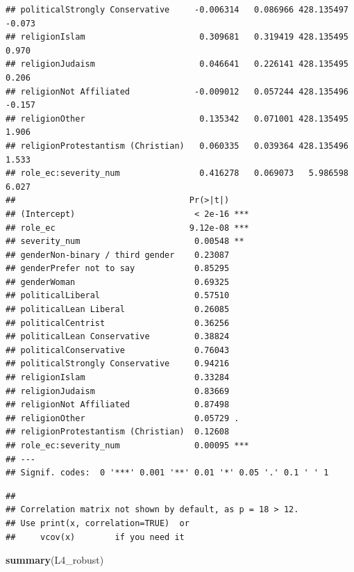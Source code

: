 \documentclass[
]{article}
\newenvironment{Shaded}{\begin{snugshade}}{\end{snugshade}}
\newcommand{\FunctionTok}[1]{\textcolor[rgb]{0.13,0.29,0.53}{\textbf{#1}}}
\newcommand{\NormalTok}[1]{#1}
\begin{document}
\begin{verbatim}
## politicalStrongly Conservative     -0.006314   0.086966 428.135497  -0.073
## religionIslam                       0.309681   0.319419 428.135495   0.970
## religionJudaism                     0.046641   0.226141 428.135495   0.206
## religionNot Affiliated             -0.009012   0.057244 428.135496  -0.157
## religionOther                       0.135342   0.071001 428.135495   1.906
## religionProtestantism (Christian)   0.060335   0.039364 428.135496   1.533
## role_ec:severity_num                0.416278   0.069073   5.986598   6.027
##                                   Pr(>|t|)    
## (Intercept)                        < 2e-16 ***
## role_ec                           9.12e-08 ***
## severity_num                       0.00548 ** 
## genderNon-binary / third gender    0.23087    
## genderPrefer not to say            0.85295    
## genderWoman                        0.69325    
## politicalLiberal                   0.57510    
## politicalLean Liberal              0.26085    
## politicalCentrist                  0.36256    
## politicalLean Conservative         0.38824    
## politicalConservative              0.76043    
## politicalStrongly Conservative     0.94216    
## religionIslam                      0.33284    
## religionJudaism                    0.83669    
## religionNot Affiliated             0.87498    
## religionOther                      0.05729 .  
## religionProtestantism (Christian)  0.12608    
## role_ec:severity_num               0.00095 ***
## ---
## Signif. codes:  0 '***' 0.001 '**' 0.01 '*' 0.05 '.' 0.1 ' ' 1
\end{verbatim}

\begin{verbatim}
## 
## Correlation matrix not shown by default, as p = 18 > 12.
## Use print(x, correlation=TRUE)  or
##     vcov(x)        if you need it
\end{verbatim}

\begin{Shaded}
\begin{Highlighting}[]
\FunctionTok{summary}\NormalTok{(L4\_robust)}
\end{Highlighting}
\end{Shaded}
\end{document}
